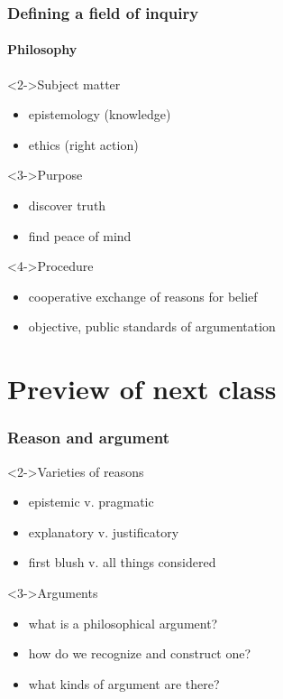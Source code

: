 \documentclass[10pt,letterpaper,xcolor=dvipsnames,handout]{beamer}
\begin{document}
\begin{frame}
\frametitle{Defining a field of inquiry}
\framesubtitle{Philosophy}

\begin{block}<2->{Subject matter}
  \begin{itemize}
    \item epistemology (knowledge)
    \item ethics (right action)
  \end{itemize}
\end{block}

\begin{block}<3->{Purpose}
  \begin{itemize}
    \item discover truth
    \item find peace of mind
  \end{itemize}
\end{block}

\begin{block}<4->{Procedure}
  \begin{itemize}
    \item cooperative exchange of reasons for belief
    \item objective, public standards of argumentation
  \end{itemize}
\end{block}

\end{frame}

\section{Preview of next class}

\begin{frame}
\frametitle{Reason and argument}

\begin{block}<2->{Varieties of reasons}
  \begin{itemize}
    \item epistemic v. pragmatic
    \item explanatory v. justificatory
    \item first blush v. all things considered
  \end{itemize}
\end{block}

\begin{block}<3->{Arguments}
  \begin{itemize}
    \item what is a philosophical argument?
    \item how do we recognize and construct one?
    \item what kinds of argument are there?
  \end{itemize}
\end{block}

\end{frame}
\end{document}
